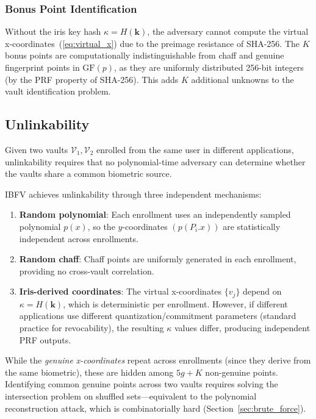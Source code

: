 \documentclass[3p,twocolumn]{elsarticle}
\newcommand{\IBFV}{\textsf{IBFV}}
\newcommand{\GFp}{\mathrm{GF}(p)}
\begin{document}
\subsubsection{Bonus Point Identification}
Without the iris key hash $\kappa = H(\mathbf{k})$, the adversary cannot compute the virtual x-coordinates~(\ref{eq:virtual_x}) due to the preimage resistance of SHA-256. The $K$ bonus points are computationally indistinguishable from chaff and genuine fingerprint points in $\GFp{}$, as they are uniformly distributed 256-bit integers (by the PRF property of SHA-256). This adds $K$ additional unknowns to the vault identification problem.

\subsection{Unlinkability}
\label{sec:unlinkability}

Given two vaults $\mathcal{V}_1, \mathcal{V}_2$ enrolled from the same user in different applications, unlinkability requires that no polynomial-time adversary can determine whether the vaults share a common biometric source.

\IBFV{} achieves unlinkability through three independent mechanisms:
\begin{enumerate}
    \item \textbf{Random polynomial}: Each enrollment uses an independently sampled polynomial $p(x)$, so the $y$-coordinates $(p(P_i.x))$ are statistically independent across enrollments.
    \item \textbf{Random chaff}: Chaff points are uniformly generated in each enrollment, providing no cross-vault correlation.
    \item \textbf{Iris-derived coordinates}: The virtual x-coordinates $\{v_j\}$ depend on $\kappa = H(\mathbf{k})$, which is deterministic per enrollment. However, if different applications use different quantization/commitment parameters (standard practice for revocability), the resulting $\kappa$ values differ, producing independent PRF outputs.
\end{enumerate}

\noindent While the \emph{genuine x-coordinates} repeat across enrollments (since they derive from the same biometric), these are hidden among $5g + K$ non-genuine points. Identifying common genuine points across two vaults requires solving the intersection problem on shuffled sets---equivalent to the polynomial reconstruction attack, which is combinatorially hard (Section~\ref{sec:brute_force}).
\end{document}
